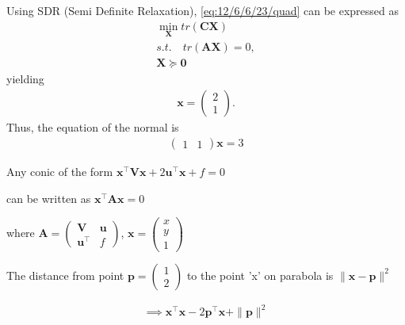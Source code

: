 \documentclass[journal,10pt,twocolumn]{article}
\let\vec\mathbf
\newcommand{\myvec}[1]{\ensuremath{\begin{pmatrix}#1\end{pmatrix}}}
\providecommand{\brak}[1]{\ensuremath{\left(#1\right)}}
\begin{document}
	Using SDR (Semi Definite Relaxation), 
	\eqref{eq:12/6/6/23/quad}
	can be expressed as
\begin{align}
	\min_{\vec{X}} tr\brak{\vec{C}\vec{X}}
	\\
s.t. \quad	tr\brak{\vec{A}\vec{X}} =0,
\\
 \vec{X}\succeq \vec{0}
\end{align}
	yielding
\begin{align}
\vec{x} = \myvec{2\\1}.
\end{align}
Thus, the 
equation of the normal is
\begin{align}
	\myvec{1 &1}\vec{x}=3
\end{align}
\iffalse
\begin{center}
 Any conic of the form  $\vec{x^{\top}}\vec{V}\vec{x} + 2\vec{u^{\top}}\vec{x} + f = 0$ \end{center}
\begin{center} can be written as $\vec{x^{\top}}\vec{A}\vec{x} = 0$\end{center} 
\begin{center}
where $\vec{A} = \myvec{\vec{V}&\vec{u}\\\vec{u^{\top}}&f}$, $\vec{x} =\myvec{x\\y\\1}$
\end{center}
\begin{center}
The distance from point $\vec{p} = \myvec{1\\2}$ to the point 'x' on parabola is $\|\vec{x}-\vec{p}\|^2$
\end{center}

\begin{gather*}
	\implies \vec{x^{\top}}\vec{x} - 2\vec{p^{\top}}\vec{x} + \|\vec{p}\|^2
\end{gather*}
\end{document}
